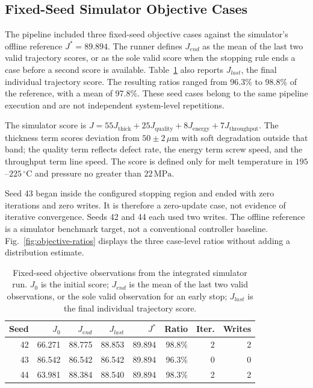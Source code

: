 \subsection{Fixed-Seed Simulator Objective Cases}
\label{sec:eval-objective}
The pipeline included three fixed-seed objective cases against the simulator's
offline reference $J^*=89.894$. The runner defines $J_{end}$ as the mean of
the last two valid trajectory scores, or as the sole valid score when the
stopping rule ends a case before a second score is available. Table~\ref{tab:integrated-seeds}
also reports $J_{last}$, the final individual trajectory score. The resulting
ratios ranged from 96.3\% to 98.8\% of the reference, with a mean of 97.8\%.
These seed cases belong to the same pipeline execution and are not independent
system-level repetitions.

The simulator score is
$J=55J_{\mathrm{thick}}+25J_{\mathrm{quality}}+8J_{\mathrm{energy}}+7J_{\mathrm{throughput}}$.
The thickness term scores deviation from $50\pm2\,\mu\mathrm{m}$ with soft
degradation outside that band; the quality term reflects defect rate, the
energy term screw speed, and the throughput term line speed. The score is
defined only for melt temperature in $195$--$225\,^{\circ}\mathrm{C}$ and
pressure no greater than $22\,\mathrm{MPa}$.

Seed 43 began inside the configured stopping region and ended with zero
iterations and zero writes. It is therefore a zero-update case, not evidence
of iterative convergence. Seeds 42 and 44 each used two writes. The offline
reference is a simulator benchmark target, not a conventional controller
baseline. Fig.~\ref{fig:objective-ratios} displays the three case-level
ratios without adding a distribution estimate.

\begin{table}[!t]
\centering
\caption{Fixed-seed objective observations from the integrated simulator
run. $J_0$ is the initial score; $J_{end}$ is the mean of the last two valid observations, or the sole
valid observation for an early stop; $J_{last}$ is the final individual
trajectory score.}
\label{tab:integrated-seeds}
\footnotesize
\setlength{\tabcolsep}{2pt}
\begin{tabular}{@{}r r r r r r r r@{}}
\toprule
Seed & $J_0$ & $J_{end}$ & $J_{last}$ & $J^*$ & Ratio & Iter. & Writes\\
\midrule
42 & 66.271 & 88.775 & 88.853 & 89.894 & 98.8\% & 2 & 2\\
43 & 86.542 & 86.542 & 86.542 & 89.894 & 96.3\% & 0 & 0\\
44 & 63.981 & 88.384 & 88.540 & 89.894 & 98.3\% & 2 & 2\\
\bottomrule
\end{tabular}
\end{table}

